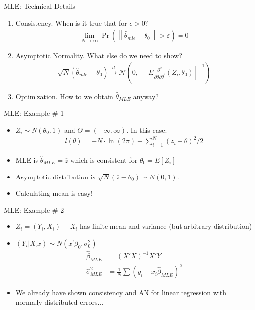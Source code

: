 \documentclass[aspectratio=169]{beamer}
\begin{document}
\begin{frame}{MLE: Technical Details}
\begin{enumerate}
\item Consistency. When is it true that for $\epsilon>0$?
\begin{align*}
\lim _ { N \rightarrow \infty } \operatorname { Pr } \left( \left\| \hat { \theta } _ { m l e } - \theta _ { 0 } \right\| > \varepsilon \right) = 0
\end{align*}
\item Asymptotic Normality. What else do we need to show?
\begin{align*}
\sqrt { N } \left( \hat { \theta } _ { m l e } - \theta _ { 0 } \right) \stackrel { d } { \longrightarrow } \mathcal { N } \left( 0 , - \left[ E \frac { \partial ^ { 2 } } { \partial \theta \partial \theta ^ { \prime } } \left( Z _ { i } , \theta _ { 0 } \right) \right] ^ { - 1 } \right)
\end{align*}
\item Optimization. How to we obtain $\widehat{\theta}_{MLE}$ anyway?
\end{enumerate}
\end{frame}


\begin{frame}{MLE: Example \# 1}
\begin{itemize}
\item $Z_i \sim N(\theta_0,1)$ and $\Theta = (-\infty,\infty)$. In this case:
\begin{align*}
l ( \theta ) = - N \cdot \ln ( 2 \pi ) - \sum _ { i = 1 } ^ { N } \left( z _ { i } - \theta \right) ^ { 2 } / 2
\end{align*}
\item MLE is $\widehat{\theta}_{MLE}=\overline{z}$ which is consistent for $\theta_0 = E[Z_i]$
\item Asymptotic distribution is $\sqrt{N} ( \overline{z}-\theta_0) \sim N(0,1)$.
\item Calculating mean is easy!
\end{itemize}
\end{frame}




\begin{frame}{MLE: Example \# 2}
\begin{itemize}
\item $Z_i = (Y_i, X_i)$---   $X_i$ has finite mean and variance (but arbitrary distribution)
\item $(Y_i | X_i  x) \sim N(x' \beta_0, \sigma_0^2)$
\begin{align*}
\widehat{\beta}_{MLE} &= (X'X)^{-1} X'Y\\
\widehat{\sigma}^2_{MLE} &= \frac{1}{N} \sum (y_i - x_i \widehat{\beta}_{MLE})^2
\end{align*}
\item We already have shown consistency and AN for linear regression with normally distributed errors...
\end{itemize}
\end{frame}
\end{document}
